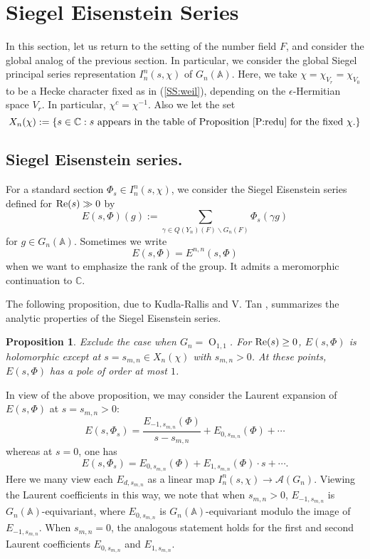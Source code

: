 \documentclass[10pt]{amsart}
\theoremstyle{plain}
\newtheorem{Prop}[equation]{Proposition}
\numberwithin{equation}{section}
\begin{document}
 
 
 \section{\bf Siegel Eisenstein Series} \label{S:Siegel-Eis}
 In this section, let us return to the setting of the number field
 $F$, and consider the global analog of the previous
 section.  In particular, we consider the global   Siegel principal series
 representation $I^n_n(s ,\chi)$  of $G_n({\mathbb{A}})$.  Here,  we  take
 $\chi=\chi_{V_r}=\chi_{V_0}$ to be a Hecke character fixed as in
 (\ref{SS:weil}), depending on the $\epsilon$-Hermitian space $V_r$. 
In particular, $\chi^c = \chi^{-1}$.  Also we let the set 
\[
X_n(\chi):=\{s\in{\mathbb C}: \text{$s$ appears in the table of Proposition \ref{P:redu} for the fixed $\chi$.}\}
\]
\vskip 5pt

 \subsection{\bf Siegel Eisenstein series.}
 
 For a standard section $\Phi_s \in I^n_n(s,\chi)$, we consider the Siegel
 Eisenstein series defined for ${\rm Re}(s) \gg 0$ by
 \[   
E(s, \Phi)(g) :=  \sum_{\gamma \in Q(Y_n)(F) \backslash
   G_n(F)} \Phi_s(\gamma g)
\]
for $g\in G_n({\mathbb{A}})$. Sometimes we write
\[
E(s, \Phi)=E^{n,n}(s,\Phi)
\]
when we want to emphasize the rank of the group.
It admits a meromorphic continuation to
${\mathbb C}$. 
 \vskip 5pt
 
 The following proposition, due to Kudla-Rallis \cite{KR3} and V. Tan
 \cite{T2}, summarizes the analytic properties of the Siegel
 Eisenstein series.
 \vskip 5pt
 
 \begin{Prop} \label{P:analytic}
 Exclude the case when $G_n = {\operatorname{O}}_{1,1}$.
 For ${\rm Re}(s) \geq 0$,  $E(s, \Phi)$ is holomorphic except at
 $s=s_{m,n} \in X_n(\chi)$ with $s_{m,n} > 0$. At these points,
 $E(s,\Phi)$ has a pole of order at most $1$. 
  \end{Prop}
 
 In view of the above proposition, we may consider the Laurent
 expansion of $E(s, \Phi)$ at $s = s_{m,n} > 0$:
 \[  E(s, \Phi_s) = \frac{E_{-1, s_{m,n}}(\Phi)}{s-s_{m,n}} +  E_{0, s_{m,n}}(\Phi) + \cdots\] 
 whereas at $s =0$, one has
 \[  E(s, \Phi_s) = E_{0, s_{m,n}}(\Phi) + E_{1, s_{m,n}}(\Phi) \cdot s +
 \cdots. \]
Here we many view each $E_{d, s_{m,n}}$ as a linear map
$I_n^n(s,\chi)\rightarrow{\mathcal{A}}(G_n)$.
Viewing the Laurent coefficients in this way, we note that when
$s_{m,n} > 0$, $E_{-1,s_{m,n}}$ is
 $G_n({\mathbb{A}})$-equivariant, where $E_{0, s_{m,n}}$ is $G_n({\mathbb{A}})$-equivariant
 modulo the image of $E_{-1, s_{m,n}}$.  When $s_{m,n} = 0$, the analogous
 statement holds for the first and second Laurent coefficients $E_{0, s_{m,n}}$
 and $E_{1, s_{m,n}}$.
 \vskip 5pt
 
\end{document}
